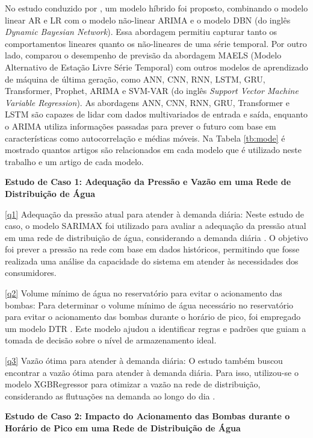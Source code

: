 No estudo conduzido por , um modelo híbrido foi proposto, combinando o modelo linear AR e LR com o modelo não-linear ARIMA e o modelo DBN (do inglês \textit{Dynamic Bayesian Network}). Essa abordagem permitiu capturar tanto os comportamentos lineares quanto os não-lineares de uma série temporal. Por outro lado,  comparou o desempenho de previsão da abordagem MAELS (Modelo Alternativo de Estação Livre Série Temporal) com outros modelos de aprendizado de máquina de última geração, como ANN, CNN, RNN, LSTM, GRU, Transformer, Prophet, ARIMA e SVM-VAR (do inglês \textit{Support Vector Machine Variable Regression}). As abordagens ANN, CNN, RNN, GRU, Transformer e LSTM são capazes de lidar com dados multivariados de entrada e saída, enquanto o ARIMA utiliza informações passadas para prever o futuro com base em características como autocorrelação e médias móveis. Na Tabela \ref{tb:mode} é mostrado quantos artigos são relacionados em cada modelo que é utilizado neste trabalho e um artigo de cada modelo.



\noindent\textbf{Estudo de Caso 1: Adequação da Pressão e Vazão em uma Rede de Distribuição de Água}

\eqref{q1} Adequação da pressão atual para atender à demanda diária: Neste estudo de caso, o modelo SARIMAX foi utilizado para avaliar a adequação da pressão atual em uma rede de distribuição de água, considerando a demanda diária \cite{2-s2.0-85099424908}. O objetivo foi prever a pressão na rede com base em dados históricos, permitindo que fosse realizada uma análise da capacidade do sistema em atender às necessidades dos consumidores.

\eqref{q2} Volume mínimo de água no reservatório para evitar o acionamento das bombas: Para determinar o volume mínimo de água necessário no reservatório para evitar o acionamento das bombas durante o horário de pico, foi empregado um modelo DTR  \cite{2-s2.0-85054695177}. Este modelo ajudou a identificar regras e padrões que guiam a tomada de decisão sobre o nível de armazenamento ideal.

\eqref{q3} Vazão ótima para atender à demanda diária: O estudo também buscou encontrar a vazão ótima para atender à demanda diária. Para isso, utilizou-se o modelo XGBRegressor para otimizar a vazão na rede de distribuição, considerando as flutuações na demanda ao longo do dia \cite{2-s2.0-85130441623}.

\textbf{Estudo de Caso 2: Impacto do Acionamento das Bombas durante o Horário de Pico em uma Rede de Distribuição de Água}

